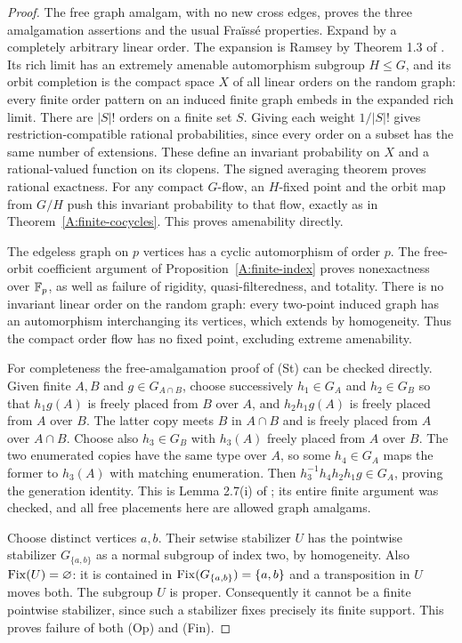 \begin{proof}
The free graph amalgam, with no new cross edges, proves the
three amalgamation assertions and the usual Fra\"iss\'e
properties. Expand by a completely arbitrary linear order.
The expansion is Ramsey by Theorem 1.3 of
\cite{ABEHNFunctions}. Its rich limit has an extremely
amenable automorphism subgroup $H\leq G$, and its orbit
completion is the compact space $X$ of all linear orders
on the random graph: every finite order pattern on an
induced finite graph embeds in the expanded rich limit.
There are $|S|!$ orders on a finite set $S$. Giving each
weight $1/|S|!$ gives restriction-compatible rational
probabilities, since every order on a subset has the same
number of extensions. These define an invariant probability
on $X$ and a rational-valued function on its clopens.
The signed averaging theorem proves rational exactness.
For any compact $G$-flow, an $H$-fixed point and the orbit
map from $G/H$ push this invariant probability to that
flow, exactly as in Theorem~\ref{A:finite-cocycles}.
This proves amenability directly.

The edgeless graph on $p$ vertices has a cyclic automorphism
of order $p$. The free-orbit coefficient argument of
Proposition~\ref{A:finite-index} proves nonexactness over
$\mathbb F_p$, as well as failure of rigidity, quasi-filteredness,
and totality. There is no invariant linear order on the
random graph: every two-point induced graph has an
automorphism interchanging its vertices, which extends by
homogeneity. Thus the compact order flow has no fixed
point, excluding extreme amenability.

For completeness the free-amalgamation proof of (St) can
be checked directly. Given finite $A,B$ and
$g\in G_{A\cap B}$, choose successively
$h_1\in G_A$ and $h_2\in G_B$ so that $h_1g(A)$ is
freely placed from $B$ over $A$, and $h_2h_1g(A)$ is
freely placed from $A$ over $B$. The latter copy meets
$B$ in $A\cap B$ and is freely placed from $A$ over
$A\cap B$. Choose also $h_3\in G_B$ with $h_3(A)$
freely placed from $A$ over $B$. The two enumerated
copies have the same type over $A$, so some $h_4\in G_A$
maps the former to $h_3(A)$ with matching enumeration.
Then $h_3^{-1}h_4h_2h_1g\in G_A$, proving the
generation identity. This is Lemma 2.7(i) of
\cite{ABMacphersonTent}; its entire finite argument was
checked, and all free placements here are allowed graph
amalgams.

Choose distinct vertices $a,b$. Their setwise stabilizer
$U$ has the pointwise stabilizer $G_{\{a,b\}}$ as a
normal subgroup of index two, by homogeneity. Also
$\operatorname{Fix}(U)=\varnothing$: it is contained in
$\operatorname{Fix}(G_{\{a,b\}})=\{a,b\}$ and a transposition in
$U$ moves both. The subgroup $U$ is proper. Consequently
it cannot be a finite pointwise stabilizer, since such a
stabilizer fixes precisely its finite support. This proves
failure of both (Op) and (Fin).
\end{proof}

